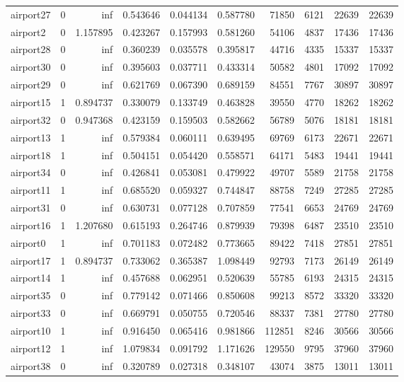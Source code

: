 \begin{longtable}{|l|r|r|r|r|r|r|r|r|r|}
airport27 & 0 & inf & 0.543646 & 0.044134 & 0.587780 & 71850 & 6121 & 22639 & 22639 \\
airport2 & 0 & 1.157895 & 0.423267 & 0.157993 & 0.581260 & 54106 & 4837 & 17436 & 17436 \\
airport28 & 0 & inf & 0.360239 & 0.035578 & 0.395817 & 44716 & 4335 & 15337 & 15337 \\
airport30 & 0 & inf & 0.395603 & 0.037711 & 0.433314 & 50582 & 4801 & 17092 & 17092 \\
airport29 & 0 & inf & 0.621769 & 0.067390 & 0.689159 & 84551 & 7767 & 30897 & 30897 \\
airport15 & 1 & 0.894737 & 0.330079 & 0.133749 & 0.463828 & 39550 & 4770 & 18262 & 18262 \\
airport32 & 0 & 0.947368 & 0.423159 & 0.159503 & 0.582662 & 56789 & 5076 & 18181 & 18181 \\
airport13 & 1 & inf & 0.579384 & 0.060111 & 0.639495 & 69769 & 6173 & 22671 & 22671 \\
airport18 & 1 & inf & 0.504151 & 0.054420 & 0.558571 & 64171 & 5483 & 19441 & 19441 \\
airport34 & 0 & inf & 0.426841 & 0.053081 & 0.479922 & 49707 & 5589 & 21758 & 21758 \\
airport11 & 1 & inf & 0.685520 & 0.059327 & 0.744847 & 88758 & 7249 & 27285 & 27285 \\
airport31 & 0 & inf & 0.630731 & 0.077128 & 0.707859 & 77541 & 6653 & 24769 & 24769 \\
airport16 & 1 & 1.207680 & 0.615193 & 0.264746 & 0.879939 & 79398 & 6487 & 23510 & 23510 \\
airport0 & 1 & inf & 0.701183 & 0.072482 & 0.773665 & 89422 & 7418 & 27851 & 27851 \\
airport17 & 1 & 0.894737 & 0.733062 & 0.365387 & 1.098449 & 92793 & 7173 & 26149 & 26149 \\
airport14 & 1 & inf & 0.457688 & 0.062951 & 0.520639 & 55785 & 6193 & 24315 & 24315 \\
airport35 & 0 & inf & 0.779142 & 0.071466 & 0.850608 & 99213 & 8572 & 33320 & 33320 \\
airport33 & 0 & inf & 0.669791 & 0.050755 & 0.720546 & 88337 & 7381 & 27780 & 27780 \\
airport10 & 1 & inf & 0.916450 & 0.065416 & 0.981866 & 112851 & 8246 & 30566 & 30566 \\
airport12 & 1 & inf & 1.079834 & 0.091792 & 1.171626 & 129550 & 9795 & 37960 & 37960 \\
airport38 & 0 & inf & 0.320789 & 0.027318 & 0.348107 & 43074 & 3875 & 13011 & 13011 \\

\end{longtable}
